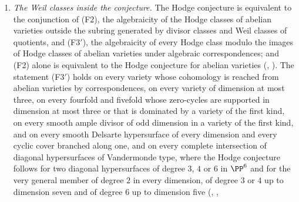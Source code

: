 \begin{theorem}[Closure]
\begin{enumerate}[label=\textup{(\roman*)},leftmargin=2.8em,itemsep=4pt]
\begin{enumerate}[label=\textup{(\alph*)},nosep,leftmargin=2.2em]
    $d\equiv15,23\pmod{24}$ (,
    );
  \item a representative of the Weil $K$-theory class that is a locally free
    sheaf on a smooth germ of codimension at least two of its support, or
    whose support has codimension at least $n$ (,
    );
  \item at a quartic CM field, a complex with secant character that is
    locally free on a smooth curve at some point, in particular the explicit
    pair of \cite[Example~11.2.7]{Mar25c} (,
    );
  \item a convolution of fewer than $2n$ line bundles with nondegenerate
    differences (); on $E_{0}^{6}$, every convolution
    of the Weil pieces with three multiples of the polarisation, and on
    $E_{0}^{8}$ every one whose pieces have their shifts within six
    consecutive values (, ).
  \end{enumerate}
\item \emph{The Weil classes inside the conjecture.} The Hodge conjecture is
  equivalent to the conjunction of \textup{(F2)}, the algebraicity of the
  Hodge classes of abelian varieties outside the subring generated by divisor
  classes and Weil classes of quotients, and \textup{(F3$'$)}, the
  algebraicity of every Hodge class modulo the images of Hodge classes of
  abelian varieties under algebraic correspondences; and \textup{(F2)} alone
  is equivalent to the Hodge conjecture for abelian varieties
  (, ). The statement \textup{(F3$'$)}
  holds on every variety whose cohomology is reached from abelian varieties by
  correspondences, on every variety of dimension at most three, on every
  fourfold and fivefold whose zero-cycles are supported in dimension at most
  three or that is dominated by a variety of the first kind, on every smooth
  ample divisor of odd dimension in a variety of the first kind, and on every
  smooth Delsarte hypersurface of every dimension and every cyclic cover
  branched along one, and on every complete intersection of diagonal
  hypersurfaces of Vandermonde type, where the Hodge conjecture follows for
  two diagonal hypersurfaces of degree $3$, $4$ or $6$ in $\PP^{6}$ and for
  the very general member of degree $2$ in every dimension, of degree $3$ or
  $4$ up to dimension seven and of degree $6$ up to dimension five
  (, ,

\end{enumerate}
\end{theorem}
